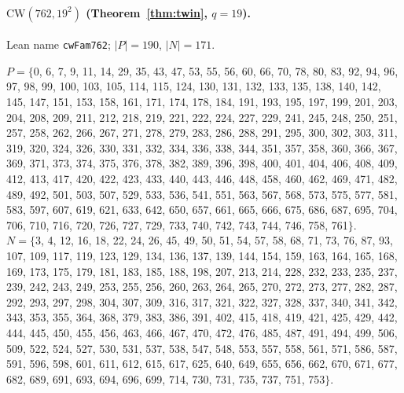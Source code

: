 \paragraph{$\mathrm{CW}(762,19^2)$ (Theorem~\ref{thm:twin}, $q=19$).} Lean name \texttt{cwFam762}; $|P|=190$, $|N|=171$.\\
{\footnotesize\raggedright $P=\{$0, 6, 7, 9, 11, 14, 29, 35, 43, 47, 53, 55, 56, 60, 66, 70, 78, 80, 83, 92, 94, 96, 97, 98, 99, 100, 103, 105, 114, 115, 124, 130, 131, 132, 133, 135, 138, 140, 142, 145, 147, 151, 153, 158, 161, 171, 174, 178, 184, 191, 193, 195, 197, 199, 201, 203, 204, 208, 209, 211, 212, 218, 219, 221, 222, 224, 227, 229, 241, 245, 248, 250, 251, 257, 258, 262, 266, 267, 271, 278, 279, 283, 286, 288, 291, 295, 300, 302, 303, 311, 319, 320, 324, 326, 330, 331, 332, 334, 336, 338, 344, 351, 357, 358, 360, 366, 367, 369, 371, 373, 374, 375, 376, 378, 382, 389, 396, 398, 400, 401, 404, 406, 408, 409, 412, 413, 417, 420, 422, 423, 433, 440, 443, 446, 448, 458, 460, 462, 469, 471, 482, 489, 492, 501, 503, 507, 529, 533, 536, 541, 551, 563, 567, 568, 573, 575, 577, 581, 583, 597, 607, 619, 621, 633, 642, 650, 657, 661, 665, 666, 675, 686, 687, 695, 704, 706, 710, 716, 720, 726, 727, 729, 733, 740, 742, 743, 744, 746, 758, 761$\}$.\\
$N=\{$3, 4, 12, 16, 18, 22, 24, 26, 45, 49, 50, 51, 54, 57, 58, 68, 71, 73, 76, 87, 93, 107, 109, 117, 119, 123, 129, 134, 136, 137, 139, 144, 154, 159, 163, 164, 165, 168, 169, 173, 175, 179, 181, 183, 185, 188, 198, 207, 213, 214, 228, 232, 233, 235, 237, 239, 242, 243, 249, 253, 255, 256, 260, 263, 264, 265, 270, 272, 273, 277, 282, 287, 292, 293, 297, 298, 304, 307, 309, 316, 317, 321, 322, 327, 328, 337, 340, 341, 342, 343, 353, 355, 364, 368, 379, 383, 386, 391, 402, 415, 418, 419, 421, 425, 429, 442, 444, 445, 450, 455, 456, 463, 466, 467, 470, 472, 476, 485, 487, 491, 494, 499, 506, 509, 522, 524, 527, 530, 531, 537, 538, 547, 548, 553, 557, 558, 561, 571, 586, 587, 591, 596, 598, 601, 611, 612, 615, 617, 625, 640, 649, 655, 656, 662, 670, 671, 677, 682, 689, 691, 693, 694, 696, 699, 714, 730, 731, 735, 737, 751, 753$\}$.\par}

